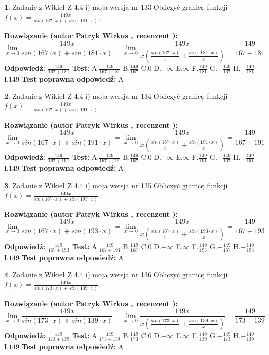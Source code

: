 \documentclass[12pt, a4paper]{article}
\theoremstyle{definition} %
\newtheorem{zad}{}
\newcommand{\zadStart}[1]{\begin{zad}#1\newline}
\newcommand{\zadStop}{\end{zad}}
\newcommand{\rozwStart}[2]{\noindent \textbf{Rozwiązanie (autor #1 , recenzent #2): }\newline}
\newcommand{\rozwStop}{\newline}
\newcommand{\odpStart}{\noindent \textbf{Odpowiedź:}\newline}
\newcommand{\odpStop}{\newline}
\newcommand{\testStart}{\noindent \textbf{Test:}\newline}
\newcommand{\testStop}{\newline}
\newcommand{\kluczStart}{\noindent \textbf{Test poprawna odpowiedź:}\newline}
\newcommand{\kluczStop}{\newline}
\begin{document}
\zadStart{Zadanie z Wikieł Z 4.4 i) moja wersja nr 133}
Obliczyć granicę funkcji $f(x)=\frac{149x}{sin(167\cdot x) +sin(181\cdot x)}$.
\zadStop
\rozwStart{Patryk Wirkus}{}
$$\lim\limits_{x\to 0}\frac{149x}{sin(167\cdot x) +sin(181\cdot x)}=\lim\limits_{x\to 0}\frac{149x}{x(\frac{sin(167\cdot x)}{x}+\frac{sin(181\cdot x)}{x})}=\frac{149}{167+181}$$
\rozwStop
\odpStart
$\frac{149}{167+181}$
\odpStop
\testStart
A.$\frac{149}{167+181}$
B.$\frac{149}{167}$
C.$0$
D.$-\infty$
E.$\infty$
F.$\frac{149}{181}$
G.$-\frac{149}{167}$
H.$-\frac{149}{181}$
I.$149$
\testStop
\kluczStart
A
\kluczStop



\zadStart{Zadanie z Wikieł Z 4.4 i) moja wersja nr 134}
Obliczyć granicę funkcji $f(x)=\frac{149x}{sin(167\cdot x) +sin(191\cdot x)}$.
\zadStop
\rozwStart{Patryk Wirkus}{}
$$\lim\limits_{x\to 0}\frac{149x}{sin(167\cdot x) +sin(191\cdot x)}=\lim\limits_{x\to 0}\frac{149x}{x(\frac{sin(167\cdot x)}{x}+\frac{sin(191\cdot x)}{x})}=\frac{149}{167+191}$$
\rozwStop
\odpStart
$\frac{149}{167+191}$
\odpStop
\testStart
A.$\frac{149}{167+191}$
B.$\frac{149}{167}$
C.$0$
D.$-\infty$
E.$\infty$
F.$\frac{149}{191}$
G.$-\frac{149}{167}$
H.$-\frac{149}{191}$
I.$149$
\testStop
\kluczStart
A
\kluczStop



\zadStart{Zadanie z Wikieł Z 4.4 i) moja wersja nr 135}
Obliczyć granicę funkcji $f(x)=\frac{149x}{sin(167\cdot x) +sin(193\cdot x)}$.
\zadStop
\rozwStart{Patryk Wirkus}{}
$$\lim\limits_{x\to 0}\frac{149x}{sin(167\cdot x) +sin(193\cdot x)}=\lim\limits_{x\to 0}\frac{149x}{x(\frac{sin(167\cdot x)}{x}+\frac{sin(193\cdot x)}{x})}=\frac{149}{167+193}$$
\rozwStop
\odpStart
$\frac{149}{167+193}$
\odpStop
\testStart
A.$\frac{149}{167+193}$
B.$\frac{149}{167}$
C.$0$
D.$-\infty$
E.$\infty$
F.$\frac{149}{193}$
G.$-\frac{149}{167}$
H.$-\frac{149}{193}$
I.$149$
\testStop
\kluczStart
A
\kluczStop



\zadStart{Zadanie z Wikieł Z 4.4 i) moja wersja nr 136}
Obliczyć granicę funkcji $f(x)=\frac{149x}{sin(173\cdot x) +sin(139\cdot x)}$.
\zadStop
\rozwStart{Patryk Wirkus}{}
$$\lim\limits_{x\to 0}\frac{149x}{sin(173\cdot x) +sin(139\cdot x)}=\lim\limits_{x\to 0}\frac{149x}{x(\frac{sin(173\cdot x)}{x}+\frac{sin(139\cdot x)}{x})}=\frac{149}{173+139}$$
\rozwStop
\odpStart
$\frac{149}{173+139}$
\odpStop
\testStart
A.$\frac{149}{173+139}$
B.$\frac{149}{173}$
C.$0$
D.$-\infty$
E.$\infty$
F.$\frac{149}{139}$
G.$-\frac{149}{173}$
H.$-\frac{149}{139}$
I.$149$
\testStop
\kluczStart
A
\kluczStop
\end{document}
